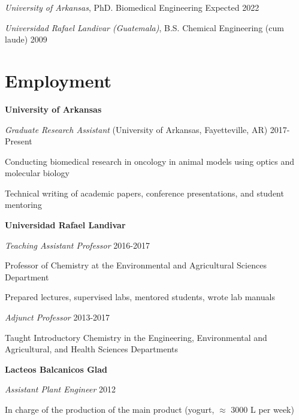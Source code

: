 \documentclass[10pt,]{article}
\providecommand{\tightlist}{%
  \setlength{\itemsep}{0pt}\setlength{\parskip}{0pt}}
\renewenvironment{itemize}{
  \begin{list}{}{
    \setlength{\leftmargin}{1.5em}
  }
}{
  \end{list}
}
\begin{document}
\emph{University of Arkansas}, PhD. Biomedical Engineering
\hfill Expected 2022

\emph{Universidad Rafael Landivar (Guatemala)}, B.S. Chemical
Engineering (cum laude) \hfill 2009

\hypertarget{employment}{%
\section{Employment}\label{employment}}

\textbf{University of Arkansas}

\emph{Graduate Research Assistant} (University of Arkansas,
Fayetteville, AR) \hfill 2017-Present

\begin{itemize}
\tightlist
\item
  Conducting biomedical research in oncology in animal models using
  optics and molecular biology
\item
  Technical writing of academic papers, conference presentations, and
  student mentoring
\end{itemize}

\textbf{Universidad Rafael Landivar}

\emph{Teaching Assistant Professor} \hfill 2016-2017

\begin{itemize}
\tightlist
\item
  Professor of Chemistry at the Environmental and Agricultural Sciences
  Department
\item
  Prepared lectures, supervised labs, mentored students, wrote lab
  manuals
\end{itemize}

\emph{Adjunct Professor} \hfill 2013-2017

\begin{itemize}
\tightlist
\item
  Taught Introductory Chemistry in the Engineering, Environmental and
  Agricultural, and Health Sciences Departments
\end{itemize}

\textbf{Lacteos Balcanicos Glad}

\emph{Assistant Plant Engineer} \hfill 2012

\begin{itemize}
\tightlist
\item
  In charge of the production of the main product (yogurt, \(\approx\)
  3000 L per week)
\end{itemize}
\end{document}
